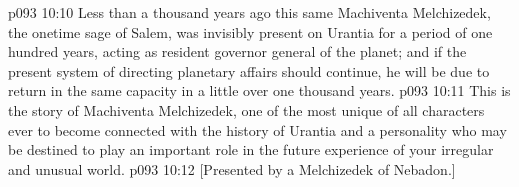 \vs p093 10:10 Less than a thousand years ago this same Machiventa Melchizedek, the onetime sage of Salem, was invisibly present on Urantia for a period of one hundred years, acting as resident governor general of the planet; and if the present system of directing planetary affairs should continue, he will be due to return in the same capacity in a little over one thousand years.
\pc \vs p093 10:11 This is the story of Machiventa Melchizedek, one of the most unique of all characters ever to become connected with the history of Urantia and a personality who may be destined to play an important role in the future experience of your irregular and unusual world.
\vsetoff
\vs p093 10:12 [Presented by a Melchizedek of Nebadon.]
